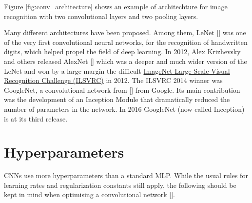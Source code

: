 Figure \ref{fig:conv_architecture} shows an example of architechture for image recognition with two convolutional layers and two pooling layers.

Many different architectures have been proposed. Among them, LeNet [\cite{lecun-98}] was one of the very first convolutional neural networks, for the recognition of handwritten digits, which helped propel the field of deep learning. In 2012, Alex Krizhevsky and others released AlexNet [\cite{krizhevsky2012imagenet}] which was a deeper and much wider version of the LeNet and won by a large margin the difficult \href{http://image-net.org/challenges/LSVRC/2012/index}{ImageNet Large Scale Visual Recognition Challenge (ILSVRC)} in 2012. The ILSVRC 2014 winner was GoogleNet, a convolutional network from [\cite{DBLP:journals/corr/SzegedyLJSRAEVR14}] from Google. Its main contribution was the development of an Inception Module that dramatically reduced the number of parameters in the network. In 2016 GoogleNet (now called Inception) is at its third release.

\section{Hyperparameters}


\acp{CNN} use more hyperparameters than a standard \ac{MLP}. While the usual rules for learning rates and regularization constants still apply, the following should be kept in mind when optimising a convolutional network [\cite{conv_wiki}].

